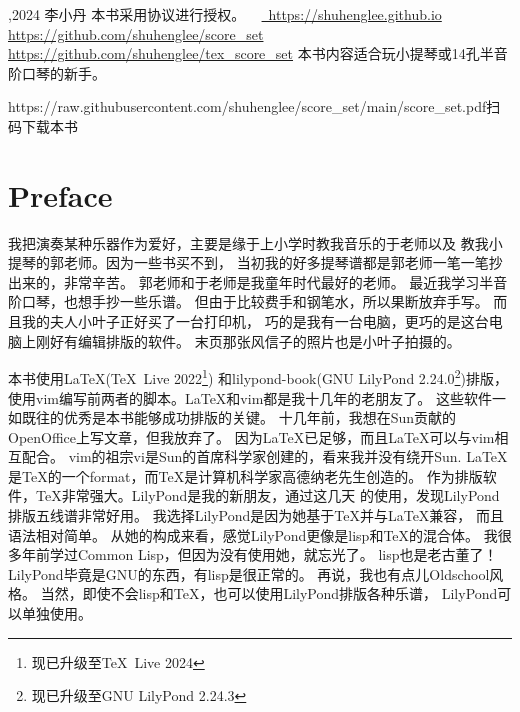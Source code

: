 \documentclass[a4paper,twoside]{memoir}
\begin{document}
\marktrue
\multimarktrue

\maketitle
\subtitlepage

\thispagestyle{empty}
{\obeylines\parindent=0pt\smallskip
{},2024 李小丹
本书采用\ccby 协议进行授权。
\ \myemail
\href{https://shuhenglee.github.io}%
{\ https://shuhenglee.github.io}
\href{https://github.com/shuhenglee/score\_set}%
{\kern-4pt\faGithub https://github.com/shuhenglee/score\_set}
\href{https://github.com/shuhenglee/tex\_score\_set}%
{\kern-4pt\faCode https://github.com/shuhenglee/tex\_score\_set}
\bigskip
本书内容适合玩小提琴或14孔半音阶口琴的新手。\bigskip}

\noindent\printbookver
\vfill
\hfill\theqr{\faGithub}%
{https://raw.githubusercontent.com/shuhenglee/score_set/main/score_set.pdf}{扫码下载本书}
\eject

\AddEverypageHook{\epcall}

\frontmatter

\chapter{Preface}
我把演奏某种乐器作为爱好，主要是缘于上小学时教我音乐的于老师以及
教我小提琴的郭老师。因为一些书买不到，
当初我的好多提琴谱都是郭老师一笔一笔抄出来的，非常辛苦。
郭老师和于老师是我童年时代最好的老师。
最近我学习半音阶口琴，也想手抄一些乐谱。
但由于比较费手和钢笔水，所以果断放弃手写。
而且我的夫人小叶子正好买了一台打印机，
巧的是我有一台电脑，更巧的是这台电脑上刚好有编辑排版的软件。
末页那张风信子的照片也是小叶子拍摄的。

本书使用\LaTeX (\TeX\ Live 2022\footnote{现已升级至\TeX\ Live 2024})
和lilypond-book(GNU LilyPond 2.24.0\footnote{现已升级至GNU LilyPond 2.24.3})排版，
使用vim编写前两者的脚本。\LaTeX 和vim都是我十几年的老朋友了。
这些软件一如既往的优秀是本书能够成功排版的关键。
十几年前，我想在Sun贡献的OpenOffice上写文章，但我放弃了。
因为\LaTeX 已足够，而且\LaTeX 可以与vim相互配合。
vim的祖宗vi是Sun的首席科学家创建的，看来我并没有绕开Sun.
\LaTeX 是\TeX 的一个format，而\TeX 是计算机科学家高德纳老先生创造的。
作为排版软件，\TeX 非常强大。LilyPond是我的新朋友，通过这几天
的使用，发现LilyPond排版五线谱非常好用。
我选择LilyPond是因为她基于\TeX 并与\LaTeX 兼容，
而且语法相对简单。
从她的构成来看，感觉LilyPond更像是lisp和\TeX 的混合体。
我很多年前学过Common Lisp，但因为没有使用她，就忘光了。
lisp也是老古董了！LilyPond毕竟是GNU的东西，有lisp是很正常的。
再说，我也有点儿Oldschool风格。
当然，即使不会lisp和\TeX ，也可以使用LilyPond排版各种乐谱，
LilyPond可以单独使用。
\end{document}
